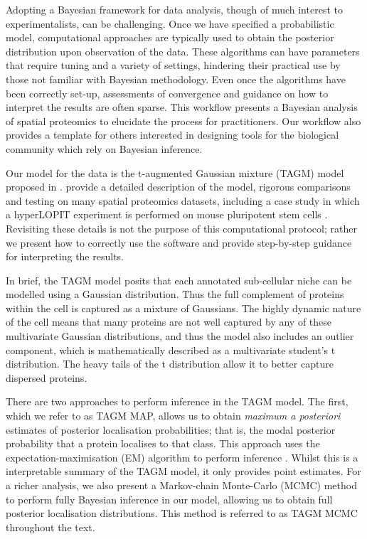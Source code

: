 \documentclass[9pt,a4paper,]{extarticle}
\begin{document}
Adopting a Bayesian framework for data analysis, though of much
interest to experimentalists, can be challenging. Once we have
specified a probabilistic model, computational approaches are typically used to obtain
the posterior distribution upon observation of the data. These
algorithms can have parameters that require tuning and a variety of settings, hindering
their practical use by those not familiar with Bayesian methodology. Even
once the algorithms have been correctly set-up, assessments of
convergence and guidance on how to interpret the results are often
sparse. This workflow presents a Bayesian analysis of spatial
proteomics to elucidate the process for practitioners. Our workflow also provides
a template for others interested in designing tools for the biological community
which rely on Bayesian inference.

Our model for the data is the t-augmented Gaussian mixture (TAGM)
model proposed in \citep{Crook:2018}. \citet{Crook:2018} provide a detailed
description of the model, rigorous comparisons and testing on many
spatial proteomics datasets, including a case study in which a hyperLOPIT
experiment is performed on mouse pluripotent stem cells
\citep{hyper, Mulvey:2017}. Revisiting these details is not the purpose of
this computational protocol; rather we present how to correctly use
the software and provide step-by-step guidance for interpreting the
results.

In brief, the TAGM model posits that each annotated sub-cellular niche
can be modelled using a Gaussian distribution. Thus the full complement
of proteins within the cell is captured as a mixture of Gaussians. The
highly dynamic nature of the cell means that many proteins are not
well captured by any of these multivariate Gaussian distributions, and
thus the model also includes an outlier component, which is mathematically
described as a multivariate student's t distribution. The heavy tails of
the t distribution allow it to better capture dispersed proteins.

There are two approaches to perform inference in the TAGM model. The
first, which we refer to as TAGM MAP, allows us to obtain \emph{maximum a
posteriori} estimates of posterior localisation probabilities; that
is, the modal posterior probability that a protein localises to that
class. This approach uses the expectation-maximisation (EM) algorithm
to perform inference \citep{EM:1977}. Whilst this is a interpretable
summary of the TAGM model, it only provides point estimates. For a
richer analysis, we also present a Markov-chain Monte-Carlo (MCMC) method
to perform fully Bayesian inference in our model, allowing us to
obtain full posterior localisation distributions. This method is
referred to as TAGM MCMC throughout the text.
\end{document}
